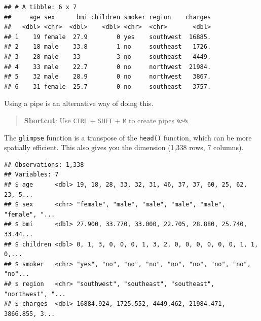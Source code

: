 \documentclass[openany]{book}
\newenvironment{Shaded}{\begin{snugshade}}{\end{snugshade}}
\newcommand{\KeywordTok}[1]{\textcolor[rgb]{0.13,0.29,0.53}{\textbf{#1}}}
\newcommand{\NormalTok}[1]{#1}
\newcommand{\OperatorTok}[1]{\textcolor[rgb]{0.81,0.36,0.00}{\textbf{#1}}}
\newcommand{\StringTok}[1]{\textcolor[rgb]{0.31,0.60,0.02}{#1}}
\begin{document}
\begin{verbatim}
## # A tibble: 6 x 7
##     age sex      bmi children smoker region    charges
##   <dbl> <chr>  <dbl>    <dbl> <chr>  <chr>       <dbl>
## 1    19 female  27.9        0 yes    southwest  16885.
## 2    18 male    33.8        1 no     southeast   1726.
## 3    28 male    33          3 no     southeast   4449.
## 4    33 male    22.7        0 no     northwest  21984.
## 5    32 male    28.9        0 no     northwest   3867.
## 6    31 female  25.7        0 no     southeast   3757.
\end{verbatim}

Using a pipe is an alternative way of doing this.

\begin{Shaded}
\end{Shaded}

\begin{quote}
\textbf{Shortcut}: Use \texttt{CTRL} + \texttt{SHFT} + \texttt{M} to create pipes \texttt{\%\textgreater{}\%}
\end{quote}

The \texttt{glimpse} function is a transpose of the \texttt{head()} function, which can be more spatially efficient. This also gives you the dimension (1,338 rows, 7 columns).

\begin{Shaded}
\end{Shaded}

\begin{verbatim}
## Observations: 1,338
## Variables: 7
## $ age      <dbl> 19, 18, 28, 33, 32, 31, 46, 37, 37, 60, 25, 62, 23, 5...
## $ sex      <chr> "female", "male", "male", "male", "male", "female", "...
## $ bmi      <dbl> 27.900, 33.770, 33.000, 22.705, 28.880, 25.740, 33.44...
## $ children <dbl> 0, 1, 3, 0, 0, 0, 1, 3, 2, 0, 0, 0, 0, 0, 0, 1, 1, 0,...
## $ smoker   <chr> "yes", "no", "no", "no", "no", "no", "no", "no", "no"...
## $ region   <chr> "southwest", "southeast", "southeast", "northwest", "...
## $ charges  <dbl> 16884.924, 1725.552, 4449.462, 21984.471, 3866.855, 3...
\end{verbatim}
\end{document}
